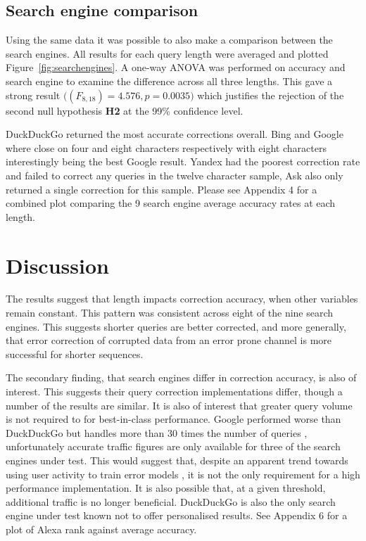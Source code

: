 \documentclass{csfourzero}
\begin{document}
\subsection{Search engine comparison}
Using the same data it was possible to also make a comparison between the search engines. All results for each query length were averaged and plotted Figure~\ref{fig:searchengines}. A one-way ANOVA was performed on accuracy and search engine to examine the difference across all three lengths. This gave a strong result $\big((F_{8,18}) = 4.576, p = 0.0035\big)$ which justifies the rejection of the second null hypothesis \textbf{H2} at the 99\% confidence level.

DuckDuckGo returned the most accurate corrections overall. Bing and Google where close on four and eight characters respectively with eight characters interestingly being the best Google result. Yandex had the poorest correction rate and failed to correct any queries in the twelve character sample, Ask also only returned a single correction for this sample. Please see Appendix 4 for a combined plot comparing the 9 search engine average accuracy rates at each length.

\section{Discussion}
\label{sec:discuss}

The results suggest that length impacts correction accuracy, when other variables remain constant. This pattern was consistent across eight of the nine search engines. This suggests shorter queries are better corrected, and more generally, that error correction of corrupted data from an error prone channel is more successful for shorter sequences.

The secondary finding, that search engines differ in correction accuracy, is also of interest. This suggests their query correction implementations differ, though a number of the results are similar. It is also of interest that greater query volume is not required to for best-in-class performance. Google performed worse than DuckDuckGo but handles more than 30 times the number of queries \cite{enginecomparewiki}, unfortunately accurate traffic figures are only available for three of the search engines under test. This would suggest that, despite an apparent trend towards using user activity to train error models \cite{webuserpoweredspelling, webuser3, webuser2learningerrormodel, webuser4google2009}, it is not the only requirement for a high performance implementation. It is also possible that, at a given threshold, additional traffic is no longer beneficial. DuckDuckGo is also the only search engine under test known not to offer personalised results. See Appendix 6 for a plot of Alexa rank against average accuracy.
\end{document}
